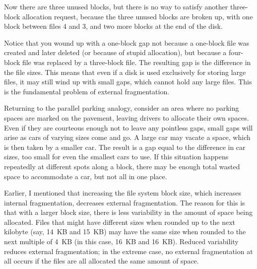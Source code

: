\iffalse
\[\begin{graph}(150,32)(-3,-12)
\graphlinecolour{0}
\fillednodesfalse
\rectnode{a}[40,20](20,10)
\rectnode{b}[30,20](55,10)
\rectnode{e}[10,20](75,10)
\rectnode{c}[40,20](100,10)
\rectnode{d}[20,20](130,10)
\autonodetext{a}{file1}
\autonodetext{c}{file3}
\autonodetext{b}{file4}
\freetext(0,-7){0}
\freetext(40,-7){4}
\freetext(70,-7){7}
\freetext(80,-7){8}
\freetext(120,-7){12}
\freetext(140,-7){14}
\end{graph}\]
\fi
Now there are three unused blocks, but there is no way to
satisfy another three-block allocation request, because the three
unused blocks are broken up, with one block between files 4 and 3, and
two more blocks at the end of the disk.

Notice that you wound up with a one-block gap not because a one-block
file was created and later deleted (or because of stupid allocation),
but because a four-block file was replaced by a three-block file.  The
resulting gap is the difference in the file sizes.  This means that
even if a disk is used exclusively for storing large files, it may
still wind up with small gaps, which cannot hold any large files.
This is the fundamental problem of external fragmentation.

Returning to the parallel parking analogy, consider an area where no
parking spaces are marked on the pavement, leaving drivers to allocate
their own spaces.  Even if they are courteous enough not to leave any
pointless gaps, small gaps will arise as cars of varying sizes come
and go.  A large car may vacate a space, which is then taken by a
smaller car.  The result is a gap equal to the difference in car
sizes, too small for even the smallest cars to use.  If this situation
happens repeatedly at different spots along a block, there may be enough
total wasted space to accommodate a car, but not all in one place.

Earlier, I mentioned that increasing the file system block size,
which increases internal fragmentation, decreases external
fragmentation.  The reason for this is that with a larger block size,
there is less variability in the amount of space being allocated.
Files that might have different sizes when rounded up to the next
kilobyte (say, 14~KB and 15~KB) may have the same size when rounded to
the next multiple of 4~KB (in this case, 16~KB and 16~KB).  Reduced
variability reduces external fragmentation; in the extreme case, no
external fragmentation at all occurs if the files are all allocated
the same amount of space.

